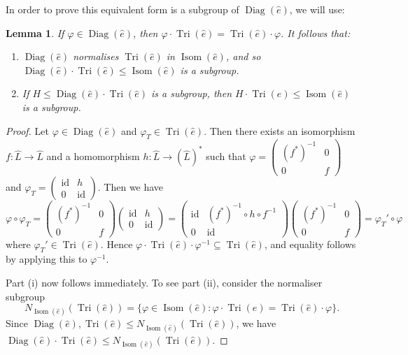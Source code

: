 \documentclass[11pt,a4paper,leqno]{amsart}
\newtheorem{lemma}[theorem]{Lemma}
\theoremstyle{definition}
\theoremstyle{remark}
\newenvironment{clist}[1]
{\begin{enumerate}[\normalfont #1]}
{\end{enumerate}}
\newcommand{\wh}{\widehat}
\DeclareMathOperator{\id}{id}
\DeclareMathOperator{\Isom}{Isom}
\DeclareMathOperator{\DiagIsom}{Diag}
\DeclareMathOperator{\TriIsom}{Tri}
\begin{document}
In order to prove this equivalent form is a subgroup of $\DiagIsom(\wh e)$, we will use:

\begin{lemma} \label{lemma:Diag-Tri-commute}
If $\varphi \in \DiagIsom(\wh e)$, then $\varphi \cdot \TriIsom(\wh e) = \TriIsom(\wh e) \cdot \varphi$. It follows that:
\begin{clist}{(i)}
\item
$\DiagIsom(\wh e)$ normalises $\TriIsom(\wh e)$ in $\Isom(\wh e)$, and so $\DiagIsom(\wh e) \cdot \TriIsom(\wh e) \le \Isom(\wh e)$ is a subgroup. 
\item 
If $H \le \DiagIsom(\wh e) \cdot \TriIsom(\wh e)$ is a subgroup, then $H \cdot \TriIsom(\wh e) \le \Isom(\wh e)$ is a subgroup.
\end{clist}
\end{lemma}

\begin{proof}
Let $\varphi \in \DiagIsom(\wh e)$ and $\varphi_T \in \TriIsom(\wh e)$. Then there exists an isomorphism $f \colon \wh L \to \wh L$ and a homomorphism  $h \colon  \wh L \to (\wh L)^*$ such that $\varphi = \left(\begin{smallmatrix} (f^*)^{-1} & 0 \\ 0 & f \end{smallmatrix}\right)$ and  $\varphi_T = \left(\begin{smallmatrix} \id & h \\ 0 & \id \end{smallmatrix}\right)$. 
Then we have 
\[ \varphi \circ \varphi_T = \left(\begin{smallmatrix} (f^*)^{-1} & 0 \\ 0 & f \end{smallmatrix}\right)\left(\begin{smallmatrix} \id & h \\ 0 & \id \end{smallmatrix}\right) 
= \left(\begin{smallmatrix} \id & (f^*)^{-1} \circ h \circ f^{-1} \\ 0 & \id \end{smallmatrix}\right)
\left(\begin{smallmatrix} (f^*)^{-1} & 0 \\ 0 & f \end{smallmatrix}\right) = \varphi_T' \circ \varphi \]
where $\varphi_T' \in \TriIsom(\wh e)$. 
Hence $\varphi \cdot \TriIsom(\wh e) \cdot \varphi^{-1} \subseteq \TriIsom(\wh e)$, and equality follows by applying this to $\varphi^{-1}$.

Part (i) now follows immediately. To see part (ii), consider the normaliser subgroup
\[ N_{\Isom(\wh e)}(\TriIsom(\wh e)) = \{ \varphi \in \Isom(\wh e) : \varphi \cdot \TriIsom(\wh e) = \TriIsom(\wh e) \cdot \varphi\}.\]
Since $\DiagIsom(\wh e), \TriIsom(\wh e) \le N_{\Isom(\wh e)}(\TriIsom(\wh e))$, we have $\DiagIsom(\wh e) \cdot \TriIsom(\wh e) \le N_{\Isom(\wh e)}(\TriIsom(\wh e))$.
\end{proof}
\end{document}
